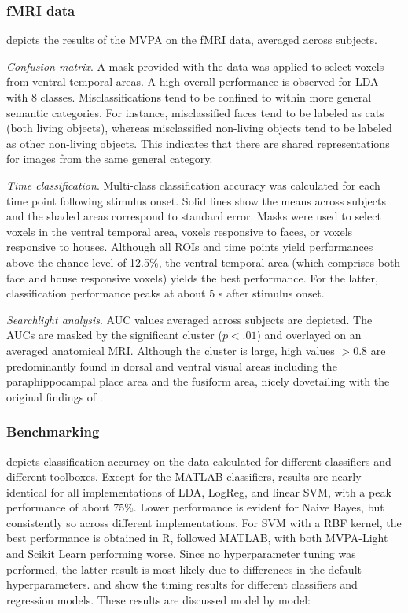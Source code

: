\documentclass[utf8]{frontiersSCNS} %
\begin{document}
\subsubsection{fMRI data}

 depicts the results of the MVPA on the fMRI data, averaged across subjects.

\textit{Confusion matrix}. A mask provided with the data was applied to select voxels from ventral temporal areas. 
A high overall performance is observed for LDA with 8 classes. Misclassifications tend to be confined to within more general semantic categories. For instance, misclassified faces tend to be labeled as cats (both living objects), whereas misclassified non-living objects tend to be labeled as other non-living objects. This indicates that there are shared representations for images from the same general category.

\textit{Time classification}. Multi-class classification accuracy was calculated for each time point following stimulus onset. Solid lines show the means across subjects and the shaded areas correspond to standard error. Masks were used to select voxels in the ventral temporal area, voxels responsive to faces, or voxels responsive to houses. Although all ROIs and time points yield performances above the chance level of 12.5\%, the ventral temporal area (which comprises both face and house responsive voxels) yields the best performance. For the latter, classification performance peaks at about 5 s after stimulus onset.

\textit{Searchlight analysis}. AUC values averaged across subjects are depicted. The AUCs are masked by the significant cluster ($p < .01$) and overlayed on an averaged anatomical MRI. Although the cluster is large, high values $>0.8$ are predominantly found in dorsal and ventral visual areas including the paraphippocampal place area and the fusiform area, nicely dovetailing with the original findings of \cite{Haxby2001}.

\subsubsection{Benchmarking}

 depicts classification accuracy on the \cite{Wakeman2015ADataset} data calculated for different classifiers and different toolboxes. Except for the MATLAB classifiers, results are nearly identical  for all implementations of LDA, LogReg, and linear SVM, with a peak performance of about 75\%. Lower performance is evident for Naive Bayes, but consistently so across different implementations. For SVM with a RBF kernel, the best performance is obtained in R, followed MATLAB, with both MVPA-Light and Scikit Learn performing worse. Since no hyperparameter tuning was performed, the latter result is most likely due to differences in the default hyperparameters.  and  show the timing results for different classifiers and regression models. These results are discussed model by model:
\end{document}
